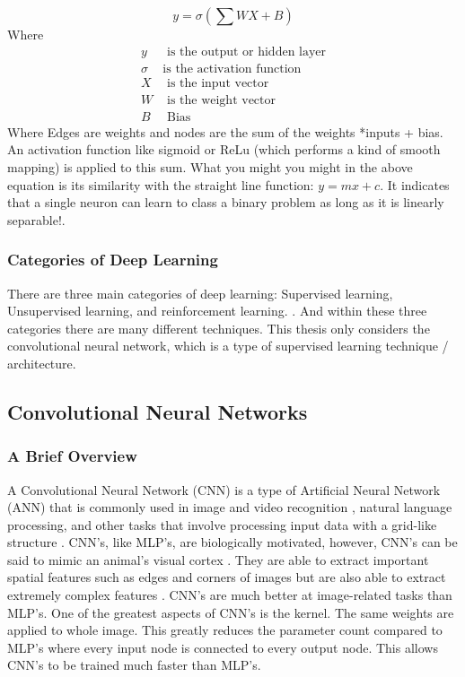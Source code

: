  \begin{equation*}
 	y =  \sigma\left(\sum WX + B\right)
 \end{equation*}
 Where
 \begin{align*}
 	y &  \text{ is the output or hidden layer} \\
 	\sigma &  \text{is the activation function} \\
 	X &  \text{ is the input vector} \\
 	W &  \text{ is the weight vector} \\
 	B &  \text{ Bias}
 \end{align*}
 Where Edges are weights and nodes are the sum of the weights *inputs + bias. An activation function like sigmoid or ReLu (which performs a kind of smooth mapping) is applied to this sum. What you might you might in the above equation is its similarity with the straight line function: $y = mx + c$. It indicates that a single neuron can learn to class a binary problem as long as it is linearly separable!. \\
 
 \subsubsection*{Categories of Deep Learning}
 There are three main categories of deep learning: Supervised learning, Unsupervised learning, and reinforcement learning. \cite{alzubaidi2021review}. And within these three categories there are many different techniques. This thesis only considers the convolutional neural network, which is a type of supervised learning technique / architecture. 

\subsection{Convolutional Neural Networks}
\subsubsection*{A Brief Overview}
A Convolutional Neural Network (CNN) is a type of Artificial Neural Network (ANN) that is commonly used in image and video recognition , natural language processing, and other tasks that involve processing input data with a grid-like structure \cite{li2021survey}. CNN's, like MLP's, are biologically motivated, however, CNN's can be said to mimic an animal's visual cortex \cite{angermueller2016deep}. They are  able to extract important spatial features such as edges and corners of images but are also able to extract extremely complex features \cite{KATTENBORN202124}. CNN's are much better at image-related tasks than MLP's. One of the greatest aspects of CNN's is the kernel. The same weights are applied to whole image. This greatly reduces the parameter count compared to MLP's where every input node is connected to every output node. This allows CNN's to be trained much faster than MLP's.

